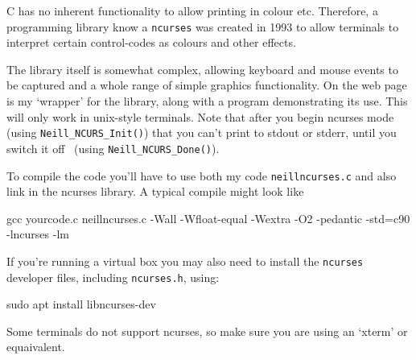 C has no inherent functionality to allow printing in colour etc.
Therefore, a programming library know a \verb^ncurses^ was created in 1993
to allow terminals to interpret certain control-codes as colours and other effects. 

The library itself is somewhat complex, allowing keyboard and mouse events to
be captured and a whole range of simple graphics functionality.
On the web page is my `wrapper' for the library, along with a program demonstrating its use.
This will only work in unix-style terminals. 
Note that after you begin ncurses mode (using \verb^Neill_NCURS_Init()^) that
you can't print to stdout or stderr, until you switch it off ~(using \verb^Neill_NCURS_Done()^).

To compile the code you'll have to use both my code \verb^neillncurses.c^
and also link in the ncurses library. A typical compile might look like
\begin{terminaloutput}
gcc yourcode.c neillncurses.c -Wall -Wfloat-equal -Wextra -O2
    -pedantic -std=c90 -lncurses -lm
\end{terminaloutput}

If you're running a virtual box you may also need to install the \verb^ncurses^ developer
files, including \verb^ncurses.h^, using:
\begin{terminaloutput}
sudo apt install libncurses-dev
\end{terminaloutput}

Some terminals do not support ncurses, so make sure you are using an `xterm' or equaivalent.
